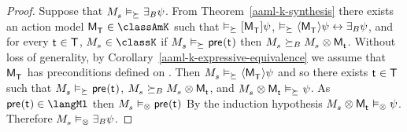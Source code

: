 \begin{proof}
Suppose that $\kPModel{\kStateS} \entails_{\simulates} \someactsBs \psi$.
From Theorem~\ref{aaml-k-synthesis} there exists an action model $\aPModel{\aStatesT} \in \classAmK$ such that 
$\entails_{\simulates} \actionA{\aPModel{\aStatesT}} \psi$,
$\entails_{\simulates} \actionE{\aPModel{\aStatesT}} \psi \iff \someactsBs \psi$, and
for every $\aStateT \in \aStatesT$, $\kPModel{\kStateS} \in \classK$ if $\kPModel{\kStateS} \entails_{\simulates} \aPrecondition(\aStateT)$ then $\kPModel{\kStateS} \simulatesBs \kPModel{\kStateS} \exec \aPModel{\aStateT}$.
Without loss of generality, by Corollary~\ref{aaml-k-expressive-equivalence} we assume that $\aPModel{\aStatesT}$ has preconditions defined on \langMl{}.
Then $\kPModel{\kStateS} \entails_{\simulates} \actionE{\aPModel{\aStatesT}} \psi$ and so there exists $\aStateT \in \aStatesT$ such that $\kPModel{\kStateS} \entails_{\simulates} \aPrecondition(\aStateT)$, $\kPModel{\kStateS} \simulatesBs \kPModel{\kStateS} \exec \aPModel{\aStateT}$, and $\kPModel{\kStateS} \exec \aPModel{\aStateT} \entails_{\simulates} \psi$.
As $\aPrecondition(\aStateT) \in \langMl$ then $\kPModel{\kStateS} \entails_{\exec} \aPrecondition(\aStateT)$
By the induction hypothesis $\kPModel{\kStateS} \exec \aPModel{\aStateT} \entails_{\exec} \psi$.
Therefore $\kPModel{\kStateS} \entails_\exec \someactsBs \psi$.
\end{proof}
